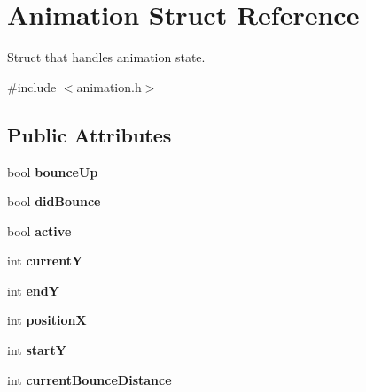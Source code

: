 \hypertarget{struct_animation}{\section{Animation Struct Reference}
\label{struct_animation}
}


Struct that handles animation state.  




{\ttfamily \#include $<$animation.\-h$>$}

\subsection*{Public Attributes}
\begin{DoxyCompactItemize}
\item 
\hypertarget{struct_animation_a82d1d99dc58d52abf27385cd556aa534}{bool {\bfseries bounce\-Up}}\label{struct_animation_a82d1d99dc58d52abf27385cd556aa534}

\item 
\hypertarget{struct_animation_aea31cea7c443a26db5be51260678c93f}{bool {\bfseries did\-Bounce}}\label{struct_animation_aea31cea7c443a26db5be51260678c93f}

\item 
\hypertarget{struct_animation_ab7b2041b8fe676c3980eb27feb3c24d7}{bool {\bfseries active}}\label{struct_animation_ab7b2041b8fe676c3980eb27feb3c24d7}

\item 
\hypertarget{struct_animation_a0e5e8258f63ad3af3889c05dadbd50dd}{int {\bfseries current\-Y}}\label{struct_animation_a0e5e8258f63ad3af3889c05dadbd50dd}

\item 
\hypertarget{struct_animation_a270b071f76360d3a3d354fdc82034273}{int {\bfseries end\-Y}}\label{struct_animation_a270b071f76360d3a3d354fdc82034273}

\item 
\hypertarget{struct_animation_a4a79cc62a84e6f59fe7a9671c45e9afa}{int {\bfseries position\-X}}\label{struct_animation_a4a79cc62a84e6f59fe7a9671c45e9afa}

\item 
\hypertarget{struct_animation_ab9869e44134973b0d48506e8948cce40}{int {\bfseries start\-Y}}\label{struct_animation_ab9869e44134973b0d48506e8948cce40}

\item 
\hypertarget{struct_animation_a5e1834181ba3fc0fb0c201c0f6060fd8}{int {\bfseries current\-Bounce\-Distance}}\label{struct_animation_a5e1834181ba3fc0fb0c201c0f6060fd8}


\end{DoxyCompactItemize}

